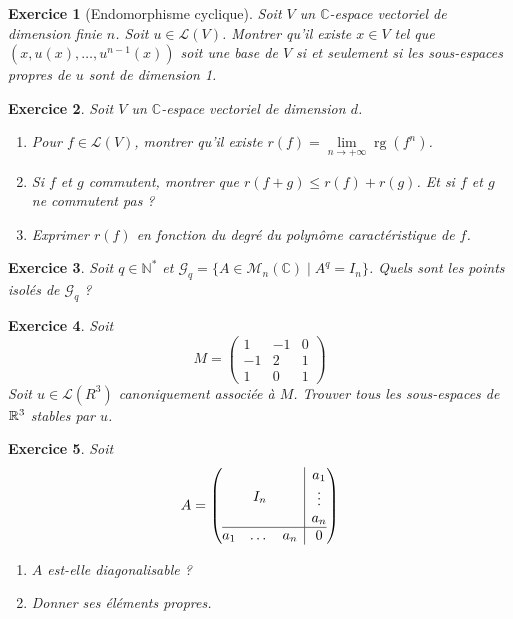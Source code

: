 \documentclass[12pt]{article}
\newtheorem{exercise}{Exercice}[section]
\theoremstyle{remark}
\theoremstyle{remark}
\newcommand{\C}{\mathbb{C}} \newcommand{\Q}{\mathbb{Q}}
\newcommand{\N}{\mathbb{N}} \newcommand{\Z}{\mathbb{Z}}
\newcommand{\M}{\mathcal{M}} \renewcommand{\L}{\mathcal{L}}
\DeclareMathOperator{\rg}{rg} \DeclareMathOperator{\Tr}{Tr}
\begin{document}
\begin{exercise}[Endomorphisme cyclique]
	Soit $V$ un $\C$-espace vectoriel de dimension finie $n$. Soit $u\in\L(V)$. Montrer qu'il existe $x\in V$ tel que $(x,u(x),\dots,u^{n-1}(x))$ soit une base de $V$ si et seulement si les sous-espaces propres de $u$ sont de dimension 1.
\end{exercise}

\begin{exercise}
	Soit $V$ un $\C$-espace vectoriel de dimension $d$.
	\begin{enumerate}
		\item Pour $f\in\L(V)$, montrer qu'il existe $r(f)=\lim\limits_{n\to+\infty}\rg(f^{n})$.
		\item Si $f$ et $g$ commutent, montrer que $r(f+g)\leqslant r(f)+r(g)$. Et si $f$ et $g$ ne commutent pas ?
		\item Exprimer $r(f)$ en fonction du degré du polynôme caractéristique de $f$.
	\end{enumerate}
\end{exercise}

\begin{exercise}
	Soit $q\in\N^{*}$ et $\mathcal{G}_{q}=\{A\in\M_{n}(\C)\mid A^{q}=I_{n}\}$. Quels sont les points isolés de $\mathcal{G}_{q}$ ?
\end{exercise}

\begin{exercise}
	Soit 
	$$
	M=
	\begin{pmatrix}
		1 & -1 & 0\\
		-1 & 2 & 1\\
		1& 0 & 1
	\end{pmatrix}
	$$
	Soit $u\in\L(R^{3})$ canoniquement associée à $M$. Trouver tous les sous-espaces de $\mathbb{R}^{3}$ stables par $u$.
\end{exercise}

\begin{exercise}
	Soit 
	$$
	A=
	\left(
		\begin{array}{@{}c|c@{}}
		I_{n} &
		\begin{matrix}
			a_{1}\\
			\vdots\\
			a_{n}
			\end{matrix}
			\\
		\hline
		\begin{matrix}
			a_{1} &
			\dots
			& a_{n}
			\end{matrix}
			& 0
		\end{array}
		\right)
	$$
	\begin{enumerate}
		\item $A$ est-elle diagonalisable ?
		\item Donner ses éléments propres.
	\end{enumerate}
\end{exercise}
\end{document}
